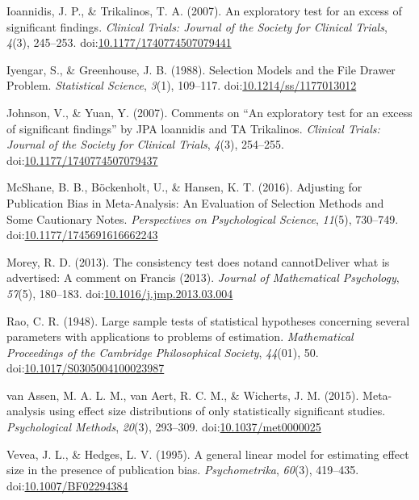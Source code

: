 \documentclass[man,floatsintext]{apa6}
\begin{document}
\leavevmode\hypertarget{ref-ioannidis2007ExploratoryTestExcess}{}%
Ioannidis, J. P., \& Trikalinos, T. A. (2007). An exploratory test for an excess of significant findings. \emph{Clinical Trials: Journal of the Society for Clinical Trials}, \emph{4}(3), 245--253. doi:\href{https://doi.org/10.1177/1740774507079441}{10.1177/1740774507079441}

\leavevmode\hypertarget{ref-iyengar1988SelectionModelsFile}{}%
Iyengar, S., \& Greenhouse, J. B. (1988). Selection Models and the File Drawer Problem. \emph{Statistical Science}, \emph{3}(1), 109--117. doi:\href{https://doi.org/10.1214/ss/1177013012}{10.1214/ss/1177013012}

\leavevmode\hypertarget{ref-johnson2007CommentsExploratoryTest}{}%
Johnson, V., \& Yuan, Y. (2007). Comments on ``An exploratory test for an excess of significant findings'' by JPA loannidis and TA Trikalinos. \emph{Clinical Trials: Journal of the Society for Clinical Trials}, \emph{4}(3), 254--255. doi:\href{https://doi.org/10.1177/1740774507079437}{10.1177/1740774507079437}

\leavevmode\hypertarget{ref-mcshane2016AdjustingPublicationBias}{}%
McShane, B. B., Böckenholt, U., \& Hansen, K. T. (2016). Adjusting for Publication Bias in Meta-Analysis: An Evaluation of Selection Methods and Some Cautionary Notes. \emph{Perspectives on Psychological Science}, \emph{11}(5), 730--749. doi:\href{https://doi.org/10.1177/1745691616662243}{10.1177/1745691616662243}

\leavevmode\hypertarget{ref-morey2013ConsistencyTestDoes}{}%
Morey, R. D. (2013). The consistency test does notand cannotDeliver what is advertised: A comment on Francis (2013). \emph{Journal of Mathematical Psychology}, \emph{57}(5), 180--183. doi:\href{https://doi.org/10.1016/j.jmp.2013.03.004}{10.1016/j.jmp.2013.03.004}

\leavevmode\hypertarget{ref-rao1948LargeSampleTests}{}%
Rao, C. R. (1948). Large sample tests of statistical hypotheses concerning several parameters with applications to problems of estimation. \emph{Mathematical Proceedings of the Cambridge Philosophical Society}, \emph{44}(01), 50. doi:\href{https://doi.org/10.1017/S0305004100023987}{10.1017/S0305004100023987}

\leavevmode\hypertarget{ref-vanassen2015MetaanalysisUsingEffect}{}%
van Assen, M. A. L. M., van Aert, R. C. M., \& Wicherts, J. M. (2015). Meta-analysis using effect size distributions of only statistically significant studies. \emph{Psychological Methods}, \emph{20}(3), 293--309. doi:\href{https://doi.org/10.1037/met0000025}{10.1037/met0000025}

\leavevmode\hypertarget{ref-vevea1995GeneralLinearModel}{}%
Vevea, J. L., \& Hedges, L. V. (1995). A general linear model for estimating effect size in the presence of publication bias. \emph{Psychometrika}, \emph{60}(3), 419--435. doi:\href{https://doi.org/10.1007/BF02294384}{10.1007/BF02294384}

\endgroup
\end{document}
